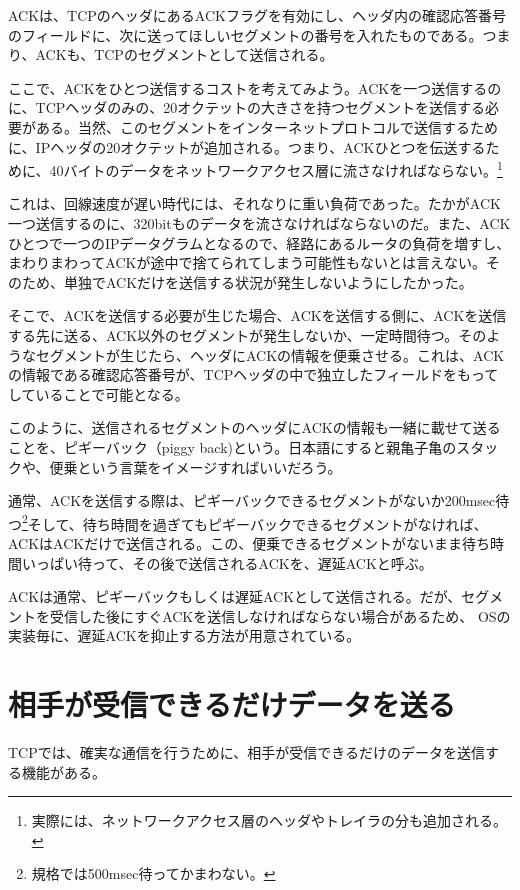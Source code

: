 ACKは、TCPのヘッダにあるACKフラグを有効にし、ヘッダ内の確認応答番号のフィールドに、次に送ってほしいセグメントの番号を入れたものである。つまり、ACKも、TCPのセグメントとして送信される。

ここで、ACKをひとつ送信するコストを考えてみよう。ACKを一つ送信するのに、TCPヘッダのみの、20オクテットの大きさを持つセグメントを送信する必要がある。当然、このセグメントをインターネットプロトコルで送信するために、IPヘッダの20オクテットが追加される。つまり、ACKひとつを伝送するために、40バイトのデータをネットワークアクセス層に流さなければならない。\footnote{実際には、ネットワークアクセス層のヘッダやトレイラの分も追加される。}

これは、回線速度が遅い時代には、それなりに重い負荷であった。たかがACK一つ送信するのに、320bitものデータを流さなければならないのだ。また、ACKひとつで一つのIPデータグラムとなるので、経路にあるルータの負荷を増すし、まわりまわってACKが途中で捨てられてしまう可能性もないとは言えない。そのため、単独でACKだけを送信する状況が発生しないようにしたかった。


そこで、ACKを送信する必要が生じた場合、ACKを送信する側に、ACKを送信する先に送る、ACK以外のセグメントが発生しないか、一定時間待つ。そのようなセグメントが生じたら、ヘッダにACKの情報を便乗させる。これは、ACKの情報である確認応答番号が、TCPヘッダの中で独立したフィールドをもってしていることで可能となる。

このように、送信されるセグメントのヘッダにACKの情報も一緒に載せて送ることを、ピギーバック（piggy back)という。日本語にすると親亀子亀のスタックや、便乗という言葉をイメージすればいいだろう。

通常、ACKを送信する際は、ピギーバックできるセグメントがないか200msec待つ\footnote{規格では500msec待ってかまわない。}そして、待ち時間を過ぎてもピギーバックできるセグメントがなければ、ACKはACKだけで送信される。この、便乗できるセグメントがないまま待ち時間いっぱい待って、その後で送信されるACKを、遅延ACKと呼ぶ。

ACKは通常、ピギーバックもしくは遅延ACKとして送信される。だが、セグメントを受信した後にすぐACKを送信しなければならない場合があるため、 OSの実装毎に、遅延ACKを抑止する方法が用意されている。


\section{相手が受信できるだけデータを送る}

TCPでは、確実な通信を行うために、相手が受信できるだけのデータを送信する機能がある。

